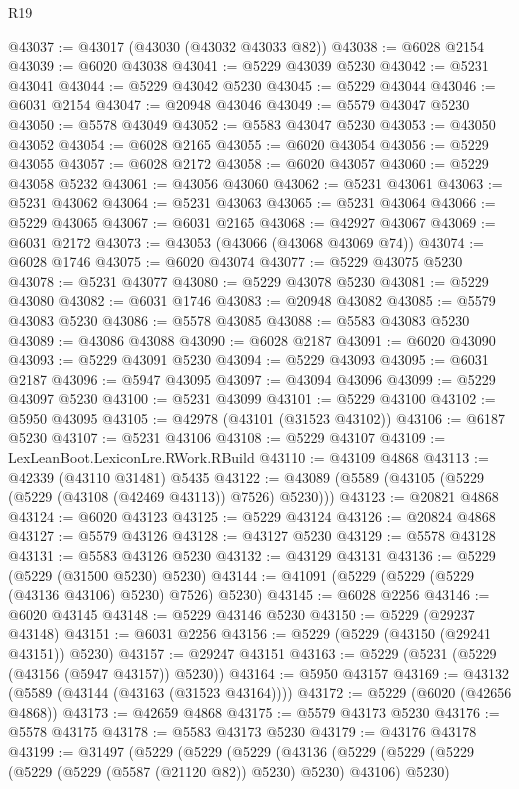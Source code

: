 \begin{lexlean}{R19}
\begin{coremodule}
@43037 := @43017 (@43030 (@43032 @43033 @82))
@43038 := @6028 @2154
@43039 := @6020 @43038
@43041 := @5229 @43039 @5230
@43042 := @5231 @43041
@43044 := @5229 @43042 @5230
@43045 := @5229 @43044
@43046 := @6031 @2154
@43047 := @20948 @43046
@43049 := @5579 @43047 @5230
@43050 := @5578 @43049
@43052 := @5583 @43047 @5230
@43053 := @43050 @43052
@43054 := @6028 @2165
@43055 := @6020 @43054
@43056 := @5229 @43055
@43057 := @6028 @2172
@43058 := @6020 @43057
@43060 := @5229 @43058 @5232
@43061 := @43056 @43060
@43062 := @5231 @43061
@43063 := @5231 @43062
@43064 := @5231 @43063
@43065 := @5231 @43064
@43066 := @5229 @43065
@43067 := @6031 @2165
@43068 := @42927 @43067
@43069 := @6031 @2172
@43073 := @43053 (@43066 (@43068 @43069 @74))
@43074 := @6028 @1746
@43075 := @6020 @43074
@43077 := @5229 @43075 @5230
@43078 := @5231 @43077
@43080 := @5229 @43078 @5230
@43081 := @5229 @43080
@43082 := @6031 @1746
@43083 := @20948 @43082
@43085 := @5579 @43083 @5230
@43086 := @5578 @43085
@43088 := @5583 @43083 @5230
@43089 := @43086 @43088
@43090 := @6028 @2187
@43091 := @6020 @43090
@43093 := @5229 @43091 @5230
@43094 := @5229 @43093
@43095 := @6031 @2187
@43096 := @5947 @43095
@43097 := @43094 @43096
@43099 := @5229 @43097 @5230
@43100 := @5231 @43099
@43101 := @5229 @43100
@43102 := @5950 @43095
@43105 := @42978 (@43101 (@31523 @43102))
@43106 := @6187 @5230
@43107 := @5231 @43106
@43108 := @5229 @43107
@43109 := LexLeanBoot.LexiconLre.RWork.RBuild
@43110 := @43109 @4868
@43113 := @42339 (@43110 @31481) @5435
@43122 := @43089 (@5589 (@43105 (@5229 (@5229 (@43108 (@42469 @43113)) @7526) @5230)))
@43123 := @20821 @4868
@43124 := @6020 @43123
@43125 := @5229 @43124
@43126 := @20824 @4868
@43127 := @5579 @43126
@43128 := @43127 @5230
@43129 := @5578 @43128
@43131 := @5583 @43126 @5230
@43132 := @43129 @43131
@43136 := @5229 (@5229 (@31500 @5230) @5230)
@43144 := @41091 (@5229 (@5229 (@5229 (@43136 @43106) @5230) @7526) @5230)
@43145 := @6028 @2256
@43146 := @6020 @43145
@43148 := @5229 @43146 @5230
@43150 := @5229 (@29237 @43148)
@43151 := @6031 @2256
@43156 := @5229 (@5229 (@43150 (@29241 @43151)) @5230)
@43157 := @29247 @43151
@43163 := @5229 (@5231 (@5229 (@43156 (@5947 @43157)) @5230))
@43164 := @5950 @43157
@43169 := @43132 (@5589 (@43144 (@43163 (@31523 @43164))))
@43172 := @5229 (@6020 (@42656 @4868))
@43173 := @42659 @4868
@43175 := @5579 @43173 @5230
@43176 := @5578 @43175
@43178 := @5583 @43173 @5230
@43179 := @43176 @43178
@43199 := @31497
    (@5229
      (@5229
        (@5229
          (@43136
            (@5229
              (@5229 (@5229 (@5229 (@5229 (@5587 (@21120 @82)) @5230) @5230) @43106) @5230)

\end{coremodule}
\end{lexlean}
